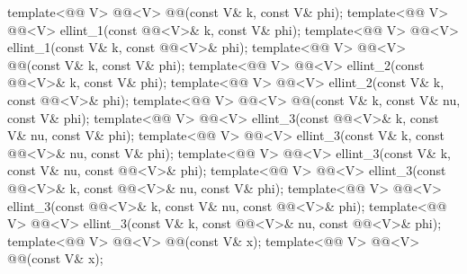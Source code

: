 \begin{itemdecl}
template<@@ V>
  @@<V> @@(const V& k, const V& phi);
template<@@ V>
  @@<V> ellint_1(const @@<V>& k, const V& phi);
template<@@ V>
  @@<V> ellint_1(const V& k, const @@<V>& phi);
template<@@ V>
  @@<V> @@(const V& k, const V& phi);
template<@@ V>
  @@<V> ellint_2(const @@<V>& k, const V& phi);
template<@@ V>
  @@<V> ellint_2(const V& k, const @@<V>& phi);
template<@@ V>
  @@<V> @@(const V& k, const V& nu, const V& phi);
template<@@ V>
  @@<V> ellint_3(const @@<V>& k, const V& nu, const V& phi);
template<@@ V>
  @@<V> ellint_3(const V& k, const @@<V>& nu, const V& phi);
template<@@ V>
  @@<V> ellint_3(const V& k, const V& nu, const @@<V>& phi);
template<@@ V>
  @@<V> ellint_3(const @@<V>& k, const @@<V>& nu, const V& phi);
template<@@ V>
  @@<V> ellint_3(const @@<V>& k, const V& nu, const @@<V>& phi);
template<@@ V>
  @@<V> ellint_3(const V& k, const @@<V>& nu, const @@<V>& phi);
template<@@ V> @@<V> @@(const V& x);
template<@@ V> @@<V> @@(const V& x);
\end{itemdecl}

